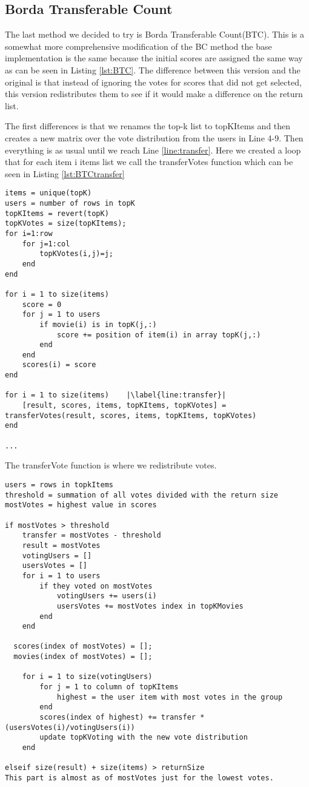 \subsection{Borda Transferable Count} \label{sec:BTC}
The last method we decided to try is Borda Transferable Count(BTC). This is a somewhat more comprehensive modification of the BC method the base implementation is the same because the initial scores are assigned the same way as can be seen in Listing \ref{lst:BTC}. The difference between this version and the original is that instead of ignoring the votes for scores that did not get selected, this version redistributes them to see if it would make a difference on the return list.

The first differences is that we renames the top-k list to topKItems and then creates a new matrix over the vote distribution from the users in Line 4-9. Then everything is as usual until we reach Line \ref{line:transfer}. Here we created a loop that for each item i items list we call the transferVotes function which can be seen in Listing \ref{lst:BTCtransfer}


\begin{lstlisting}[caption={Borda transferable count implementation},label=lst:BTC]
items = unique(topK)
users = number of rows in topK
topKItems = revert(topK)
topKVotes = size(topKItems);
for i=1:row
    for j=1:col
        topKVotes(i,j)=j;
    end 
end

for i = 1 to size(items)
	score = 0
	for j = 1 to users
		if movie(i) is in topK(j,:)
			score += position of item(i) in array topK(j,:)
		end
	end
	scores(i) = score
end

for i = 1 to size(items)	|\label{line:transfer}|
	[result, scores, items, topKItems, topKVotes] = transferVotes(result, scores, items, topKItems, topKVotes)
end
	
...
\end{lstlisting}

The transferVote function is where we redistribute votes. 

\begin{lstlisting}[caption={Implementation for the transfer method},label=lst:BTCtransfer]
users = rows in topkItems
threshold = summation of all votes divided with the return size
mostVotes = highest value in scores

if mostVotes > threshold
	transfer = mostVotes - threshold
	result = mostVotes
	votingUsers = []
	usersVotes = []
	for i = 1 to users 
		if they voted on mostVotes
			votingUsers += users(i)
			usersVotes += mostVotes index in topKMovies
		end
	end
	
  scores(index of mostVotes) = [];
  movies(index of mostVotes) = [];
	
	for i = 1 to size(votingUsers)
		for j = 1 to column of topKItems
			highest = the user item with most votes in the group
		end
		scores(index of highest) += transfer * (usersVotes(i)/votingUsers(i))
		update topKVoting with the new vote distribution 
	end
	
elseif size(result) + size(items) > returnSize
This part is almost as of mostVotes just for the lowest votes.

\end{lstlisting}